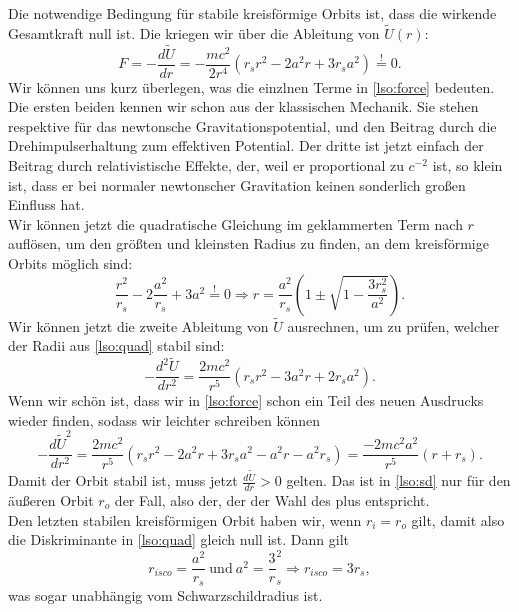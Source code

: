 \begin{Answer}[ref = lso]
	Die notwendige Bedingung für stabile kreisförmige Orbits ist, dass die wirkende Gesamtkraft null ist. Die kriegen wir über die Ableitung von $\tilde{U}\left(r\right)$:
	\begin{equation}\label{lso:force}
		F = - \frac{d\tilde{U}}{dr} = - \frac{mc^2}{2r^4}\left(r_sr^2-2a^2r + 3r_sa^2\right) \overset{!}{=} 0.
	\end{equation}
	Wir können uns kurz überlegen, was die einzlnen Terme in \eqref{lso:force} bedeuten. Die ersten beiden kennen wir schon aus der klassischen Mechanik. Sie stehen respektive für das newtonsche Gravitationspotential, und den Beitrag durch die Drehimpulserhaltung zum effektiven Potential. Der dritte ist jetzt einfach der Beitrag durch relativistische Effekte, der, weil er proportional zu $c^{-2}$ ist, so klein ist, dass er bei normaler newtonscher Gravitation keinen sonderlich großen Einfluss hat.\\
	Wir können jetzt die quadratische Gleichung im geklammerten Term nach $r$ auflösen, um den größten und kleinsten Radius zu finden, an dem kreisförmige Orbits möglich sind:
	\begin{equation}\label{lso:quad}
		\frac{r^2}{r_s} - 2\frac{a^2}{r_s} + 3a^2 \overset{!}{=} 0 \Rightarrow r = \frac{a^2}{r_s}\left(1\pm \sqrt{1-\frac{3r_s^2}{a^2}}\right).
	\end{equation} 
	Wir können jetzt die zweite Ableitung von $\tilde{U}$ ausrechnen, um zu prüfen, welcher der Radii aus \eqref{lso:quad} stabil sind:
	\begin{equation}
		-\frac{d^2\tilde{U}}{dr^2} = \frac{2mc^2}{r^5} \left(r_sr^2 - 3a^2r+2r_sa^2\right).
	\end{equation}
	Wenn wir schön ist, dass wir in \eqref{lso:force} schon ein Teil des neuen Ausdrucks wieder finden, sodass wir leichter schreiben können
	\begin{equation}\label{lso:sd}
		-\frac{d\tilde{U}^2}{dr^2} =  \frac{2mc^2}{r^5} \left(r_sr^2 - 2a^2r + 3r_sa^2 -a^2r -a^2r_s\right) = \frac{-2mc^2a^2}{r^5}\left(r+r_s\right).
	\end{equation}
	Damit der Orbit stabil ist, muss jetzt $\frac{d\tilde{U}}{dr} >0$ gelten. Das ist in \eqref{lso:sd} nur für den äußeren Orbit $r_o$ der Fall, also der, der der Wahl des plus entspricht.\\
	Den letzten stabilen kreisförmigen Orbit haben wir, wenn $r_i = r_o$ gilt, damit also die Diskriminante in \eqref{lso:quad} gleich null ist. Dann gilt 
	\begin{equation}\label{lso:risco}\boxed{
		r_{isco} = \frac{a^2}{r_s} ~\mathrm{und}~a^2 = \frac{3}r_s^2 \Rightarrow r_{isco} = 3r_s,}
	\end{equation}
	was sogar unabhängig vom Schwarzschildradius ist.
\end{Answer}





